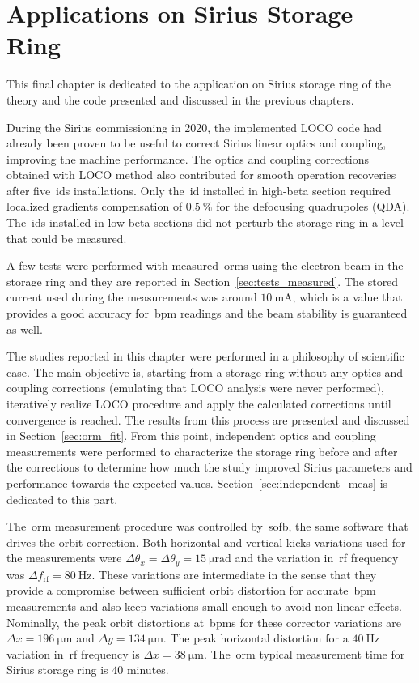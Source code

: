\chapter{Applications on Sirius Storage Ring}

This final chapter is dedicated to the application on Sirius storage ring of the theory and the code presented and discussed in the previous chapters. 

During the Sirius commissioning in 2020, the implemented LOCO code had already been proven to be useful to correct Sirius linear optics and coupling, improving the machine performance. The optics and coupling corrections obtained with LOCO method also contributed for smooth operation recoveries after five~\glspl{id} installations. Only the~\gls{id} installed in high-beta section required localized gradients compensation of $\SI{0.5}{\%}$ for the defocusing quadrupoles (QDA). The~\glspl{id} installed in low-beta sections did not perturb the storage ring in a level that could be measured. 

A few tests were performed with measured~\glspl{orm} using the electron beam in the storage ring and they are reported in Section~\ref{sec:tests_measured}. The stored current used during the measurements was around $\SI{10}{\milli\ampere}$, which is a value that provides a good accuracy for~\gls{bpm} readings and the beam stability is guaranteed as well.

The studies reported in this chapter were performed in a philosophy of scientific case. The main objective is, starting from a storage ring without any optics and coupling corrections (emulating that LOCO analysis were never performed), iteratively realize LOCO procedure and apply the calculated corrections until convergence is reached. The results from this process are presented and discussed in Section~\ref{sec:orm_fit}. From this point, independent optics and coupling measurements were performed to characterize the storage ring before and after the corrections to determine how much the study improved Sirius parameters and performance towards the expected values. Section~\ref{sec:independent_meas} is dedicated to this part.

The~\gls{orm} measurement procedure was controlled by~\gls{sofb}, the same software that drives the orbit correction. Both horizontal and vertical kicks variations used for the measurements were $\Delta \theta_x=\Delta \theta_y=\SI{15}{\micro\radian}$ and the variation in~\gls{rf} frequency was $\Delta f_{\mathrm{rf}} = \SI{80}{\hertz}$. These variations are intermediate in the sense that they provide a compromise between sufficient orbit distortion for accurate~\gls{bpm} measurements and also keep variations small enough to avoid non-linear effects. Nominally, the peak orbit distortions at~\glspl{bpm} for these corrector variations are $\Delta x = \SI{196}{\micro\meter}$ and $\Delta y = \SI{134}{\micro\meter}$. The peak horizontal distortion for a $\SI{40}{\hertz}$ variation in~\gls{rf} frequency is $\Delta x = \SI{38}{\micro\meter}$. The~\gls{orm} typical measurement time for Sirius storage ring is $40$ minutes.

